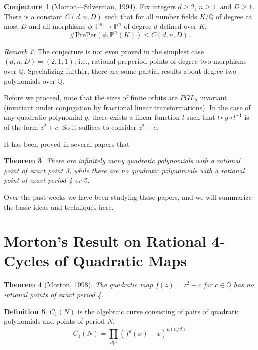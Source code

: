 \documentclass{amsart}
\theoremstyle{plain}
\newtheorem{theorem}{Theorem}[section]
\theoremstyle{definition}
\newtheorem{definition}[theorem]{Definition}
\newtheorem{conjecture}[theorem]{Conjecture}
\theoremstyle{remark}
\newtheorem{remark}[theorem]{Remark}
\renewcommand{\P}{\mathbb{P}}
\newcommand{\Q}{\mathbb{Q}}
\newcommand{\preper}{\mathrm{PrePer}}
\begin{document}
\begin{conjecture}[Morton---Silverman, 1994]
  Fix integers $d \ge 2$, $n \ge 1$, and $D \ge 1$. There is a
  constant $C(d, n, D)$ such that for all number fields $K/\Q$ of
  degree at most $D$ and all morphisms $\phi: \P^n \to \P^n$ of degree
  $d$ defined over $K$,
  \[
  \#\preper(\phi, \P^n(K)) \le C(d, n, D).
  \]
\end{conjecture}

\begin{remark}
  The conjecture is not even proved in the simplest case $(d, n, D) =
  (2, 1, 1)$, i.e., rational preperiod points of degree-two morphisms
  over $\Q$. Specializing further, there are some partial results
  about degree-two polynomials over $\Q$.

  Before we proceed, note that the sizes of finite orbits are $PGL_2$
  invariant (invariant under conjugation by fractional linear
  transformations). In the case of any quadratic polynomial $g$, there
  exists a linear function $l$ such that $l \circ g \circ l^{-1}$ is
  of the form $z^2 + c$. So it suffices to consider $z^2 + c$.

  It has been proved in several papers that
\end{remark}

\begin{theorem}
  There are infinitely many quadratic polynomials with a rational
  point of exact point 3, while there are no quadratic polynomials
  with a rational point of exact period 4 or 5.
\end{theorem}

Over the past weeks we have been studying these papers, and we will
summarize the basic ideas and techniques here.

\section{Morton's Result on Rational 4-Cycles of Quadratic Maps}

\begin{theorem} [Morton, 1998]
  The quadratic map $f(z) = z^2 + c$ for $c \in \Q$ has no rational
  points of exact period 4.
\end{theorem}

\begin{definition}
  $C_1(N)$ is the algebraic curve consisting of pairs of quadratic
  polynomials and points of period $N$.
  \[
  C_1(N) = \prod_{d|n}(f^d(x) - x)^{\mu(n/d)}
  \]
\end{definition}
\end{document}
